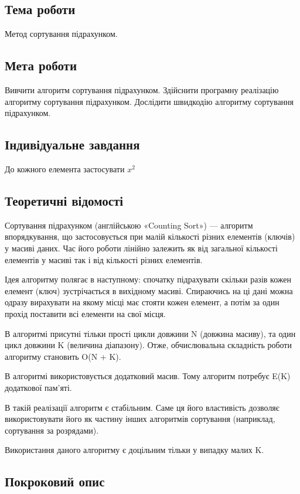 \documentclass[12pt]{extarticle}
\begin{document}
\subsection*{Тема роботи} 
Метод сортування підрахунком.

\subsection*{Мета роботи} Вивчити алгоритм сортування підрахунком. Здійснити програмну реалізацію алгоритму сортування підрахунком. Дослідити швидкодію алгоритму сортування підрахунком.

\subsection*{Індивідуальне завдання}
До кожного елемента застосувати $x^2$



\subsection*{Теоретичні відомості}
Сортування підрахунком (англійською «Counting Sort») — алгоритм впорядкування, що застосовується при малій кількості різних елементів (ключів) у масиві даних. Час його роботи лінійно залежить як від загальної кількості елементів у масиві так і від кількості різних елементів.

Ідея алгоритму полягає в наступному: спочатку підрахувати скільки разів кожен елемент (ключ) зустрічається в вихідному масиві. Спираючись на ці дані можна одразу вирахувати на якому місці має стояти кожен елемент, а потім за один прохід поставити всі елементи на свої місця.

В алгоритмі присутні тільки прості цикли довжини N (довжина масиву), та один цикл довжини K (величина діапазону). Отже, обчислювальна складність роботи алгоритму становить O(N + K).

В алгоритмі використовується додатковий масив. Тому алгоритм потребує E(K) додаткової пам’яті.

В такій реалізації алгоритм є стабільним. Саме ця його властивість дозволяє використовувати його як частину інших алгоритмів сортування (наприклад, сортування за розрядами).

Використання даного алгоритму є доцільним тільки у випадку малих K.


\subsection*{Покроковий опис}
\end{document}
